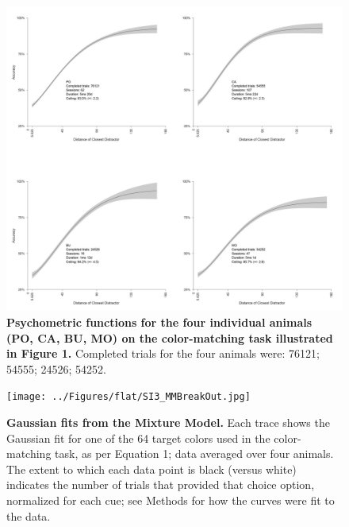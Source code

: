 \begin{figure}
    \centering
    \begin{fullwidth}
    \includegraphics[width=\textwidth+4cm]{../Figures/flat/SI2_psychometric.jpg}
    \caption{\textbf{Psychometric functions for the four individual animals (PO, CA, BU, MO) on the color-matching task illustrated in Figure 1.}
    Completed trials for the four animals were: 76121; 54555; 24526; 54252.
    } 
    \label{fig:IndiDiff}
    \end{fullwidth}
\end{figure}

\begin{figure}
    \centering
    \begin{fullwidth}
    \texttt{[image: ../Figures/flat/SI3\_MMBreakOut.jpg]}
    \caption{\textbf{Gaussian fits from the Mixture Model.}
    Each trace shows the Gaussian fit for one of the 64 target colors used in the color-matching task, as per Equation 1; data averaged over four animals. The extent to which each data point is black (versus white) indicates the number of trials that provided that choice option, normalized for each cue; see Methods for how the curves were fit to the data. 
    } 
    \label{fig:MMBreakOut}
    \end{fullwidth}
\end{figure}

